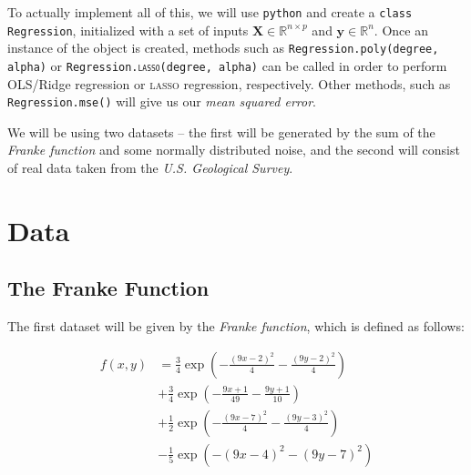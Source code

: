 \documentclass[a4paper,10pt,english]{article}
\begin{document}
To actually implement all of this, we will use \texttt{python} and create a \texttt{class Regression}, initialized with a set of inputs $\mathbf{X} \in \mathbb{R}^{n \times p}$ and $\mathbf{y} \in \mathbb{R}^n$.  Once an instance of the object is created, methods such as \texttt{Regression.poly(degree, alpha)} or \texttt{Regression.\textsc{lasso}(degree, alpha)} can be called in order to perform OLS/Ridge regression or \textsc{lasso} regression, respectively.  Other methods, such as \texttt{Regression.mse()} will give us our \textit{mean squared error}.

We will be using two datasets – the first will be generated by the sum of the \textit{Franke function} and some normally distributed noise, and the second will consist of real data taken from the \textit{U.S. Geological Survey}.

%
%
%



\section*{Data}
\label{sec:data}

\subsection*{The Franke Function}

The first dataset will be given by the \textit{Franke function}, which is defined as follows:

\begin{align*}
f(x,y) &= \frac{3}{4} \exp \left( -\frac{(9x-2)^2}{4} -\frac{(9y-2)^2}{4} \right) \\ &+ \frac{3}{4} \exp \left( -\frac{9x+1}{49} -\frac{9y+1}{10} \right) \\ &+ \frac{1}{2} \exp \left( -\frac{(9x-7)^2}{4} -\frac{(9y-3)^2}{4} \right) \\ &- \frac{1}{5} \exp \left( -(9x-4)^2 - (9y-7)^2 \right)
\end{align*}
\end{document}
